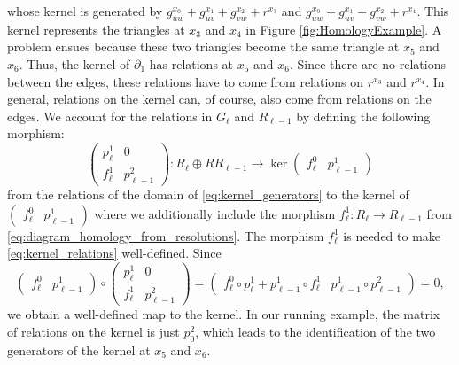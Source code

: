 \documentclass[english,a4paper,nolineno,cleveref]{socg-lipics-v2021}
\begin{document}
whose kernel is generated by $g^{x_0}_{uw}+g^{x_1}_{uv}+g^{x_2}_{vw}+r^{x_3}$ and $g^{x_0}_{uw}+g^{x_1}_{uv}+g^{x_2}_{vw}+r^{x_4}$. This kernel represents the triangles at $x_3$ and $x_4$ in Figure \ref{fig:HomologyExample}. A problem ensues because these two triangles become the same triangle at $x_5$ and $x_6$. Thus, the kernel of $\partial_1$ has relations at $x_5$ and $x_6$. Since there are no relations between the edges, these relations have to come from relations on $r^{x_3}$ and $r^{x_4}$. In general, relations on the kernel can, of course, also come from relations on the edges. We account for the relations in $G_\ell$ and $R_{\ell\minus 1}$ by defining the following morphism: 
\begin{equation} \label{eq:kernel_relations}
\begin{pmatrix}p_\ell^1 & 0 \\ f_{\ell}^1 & p_{\ell\minus 1}^2\end{pmatrix}\colon R_\ell\oplus RR_{\ell\minus 1}\rightarrow\ker\begin{pmatrix}f_\ell^0 & p_{\ell\minus 1}^1\end{pmatrix}
\end{equation}
from the relations of the domain of \eqref{eq:kernel_generators} to the kernel of $\begin{pmatrix}f_\ell^0 & p_{\ell\minus 1}^1\end{pmatrix}$ where we additionally include the morphism $f^1_{\ell}\colon R_\ell\rightarrow R_{\ell\minus 1}$ from \eqref{eq:diagram_homology_from_resolutions}. The morphism $f^1_{\ell}$ is needed to make \eqref{eq:kernel_relations} well-defined. Since
\begin{equation*}
\begin{pmatrix}f_\ell^0 & p_{\ell\minus 1}^1\end{pmatrix}\circ \begin{pmatrix}p_\ell^1 & 0 \\ f^1_{\ell} & p_{\ell\minus 1}^2\end{pmatrix}=\begin{pmatrix}f_\ell^0\circ p_\ell^1+p^1_{\ell\minus 1}\circ f^1_{\ell} & p^1_{\ell\minus 1}\circ p_{\ell\minus 1}^2\end{pmatrix}=0,
\end{equation*}
we obtain a well-defined map to the kernel. In our running example, the matrix of relations on the kernel is just $p_0^2$, which leads to the identification of the two generators of the kernel at $x_5$ and $x_6$.  
\end{document}
